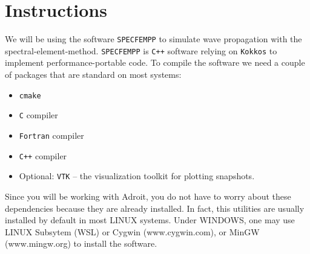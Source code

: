 \documentclass[11pt,titlepage,fleqn]{article}
\begin{document}
\section*{Instructions}

We will be using the software \texttt{SPECFEMPP} to simulate wave propagation with the spectral-element-method. \texttt{SPECFEMPP} is \texttt{C++} software relying on \texttt{Kokkos} to implement performance-portable code. To compile the software we need a couple of packages that are standard on most systems:
\begin{itemize}
	\item \texttt{cmake}
	\item \texttt{C} compiler
	\item \texttt{Fortran} compiler
	\item \texttt{C++} compiler
	\item Optional: \texttt{VTK} -- the visualization toolkit for plotting snapshots.
\end{itemize}

Since you will be working with Adroit, you do not have to worry about these dependencies because they are already installed. In fact, this utilities are usually installed by default in most LINUX systems. Under WINDOWS, one may use LINUX Subsytem (WSL) or Cygwin (www.cygwin.com), or MinGW (www.mingw.org) to install the software.
\end{document}
